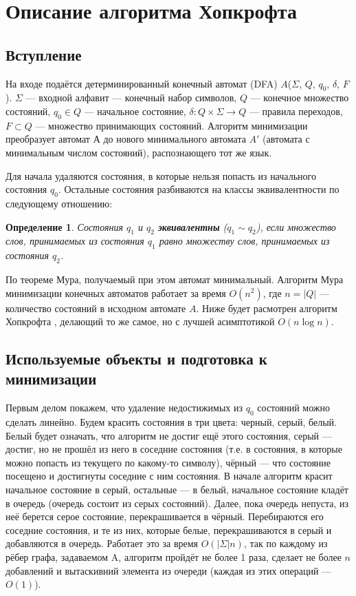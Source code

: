 \documentclass{article}
\newtheorem{definition}{Определение}%
\begin{document}
\section{Описание алгоритма Хопкрофта}
\subsection{Вступление}
На входе подаётся детерминированный конечный автомат (DFA) $A$($\Sigma$, $Q$, $q_0$, $\delta$, $F$). $\Sigma$ --- входной алфавит --- конечный набор символов, $Q$ --- конечное множество состояний, $q_0 \in Q$ --- начальное состояние, $\delta: Q \times \Sigma \longrightarrow Q$ --- правила переходов, $F \subset Q$ --- множество принимающих состояний. Алгоритм минимизации преобразует автомат $А$ до нового минимального автомата $A'$ (автомата с минимальным числом состояний), распознающего тот же язык.

Для начала удаляются состояния, в которые нельзя попасть из начального состояния $q_0$. Остальные состояния разбиваются на классы эквивалентности по следующему отношению:

\begin{definition}
Состояния $q_1$ и $q_2$ \textbf{эквивалентны} ($q_1 \sim q_2$), если множество слов, принимаемых из состояния $q_1$ равно множеству слов, принимаемых из состояния $q_2$.
\end{definition}

По теореме Мура, получаемый при этом автомат минимальный. Алгоритм Мура минимизации конечных автоматов работает за время $O(n^2)$, где $n = |Q|$ --- количество состояний в исходном автомате $A$. Ниже будет расмотрен алгоритм Хопкрофта \cite{hopcroft1971n}, делающий то же самое, но с лучшей асимптотикой $O(n \log n)$.
\subsection{Используемые объекты и подготовка к минимизации}
Первым делом покажем, что удаление недостижимых из $q_0$ состояний можно сделать линейно. Будем красить состояния в три цвета: черный, серый, белый. Белый будет означать, что алгоритм не достиг ещё этого состояния, серый --- достиг, но не прошёл из него в соседние состояния (т.е. в состояния, в которые можно попасть из текущего по какому-то символу), чёрный --- что состояние посещено и достигнуты соседние с ним состояния. В начале алгоритм красит начальное состояние в серый, остальные --- в белый, начальное состояние кладёт в очередь (очередь состоит из серых состояний). Далее, пока очередь непуста, из неё берется серое состояние, перекрашивается в чёрный. Перебираются его соседние состояния, и те из них, которые белые, перекрашиваются в серый и добавляются в очередь. Работает это за время $O(|\Sigma| n)$, так по каждому из рёбер графа, задаваемом A, алгоритм пройдёт не более 1 раза, сделает не более $n$ добавлений и вытаскивний элемента из очереди (каждая из этих операций --- $O(1)$).
\end{document}
